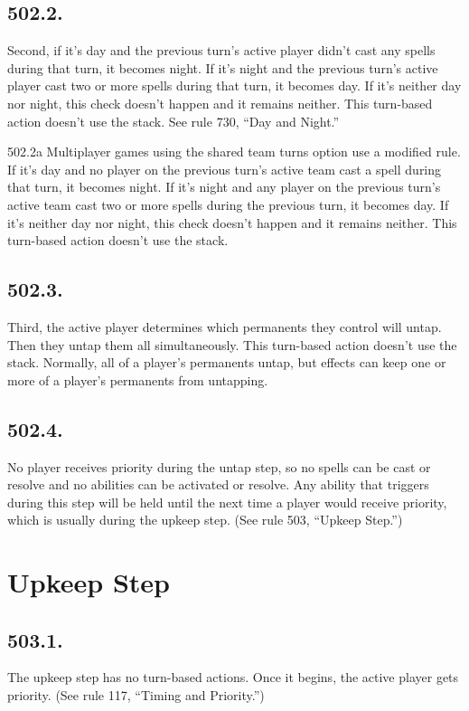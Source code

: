 \subsection*{502.2.}
Second, if it’s day and the previous turn’s active player didn’t cast any spells during that turn, it becomes night. If it’s night and the previous turn’s active player cast two or more spells during that turn, it becomes day. If it’s neither day nor night, this check doesn’t happen and it remains neither. This turn-based action doesn’t use the stack. See rule 730, “Day and Night.”

502.2a Multiplayer games using the shared team turns option use a modified rule. If it’s day and no player on the previous turn’s active team cast a spell during that turn, it becomes night. If it’s night and any player on the previous turn’s active team cast two or more spells during the previous turn, it becomes day. If it’s neither day nor night, this check doesn’t happen and it remains neither. This turn-based action doesn’t use the stack.

\subsection*{502.3.}
Third, the active player determines which permanents they control will untap. Then they untap them all simultaneously. This turn-based action doesn’t use the stack. Normally, all of a player’s permanents untap, but effects can keep one or more of a player’s permanents from untapping.

\subsection*{502.4.}
No player receives priority during the untap step, so no spells can be cast or resolve and no abilities can be activated or resolve. Any ability that triggers during this step will be held until the next time a player would receive priority, which is usually during the upkeep step. (See rule 503, “Upkeep Step.”)

\section{Upkeep Step}
\subsection*{503.1.}
The upkeep step has no turn-based actions. Once it begins, the active player gets priority. (See rule 117, “Timing and Priority.”)

